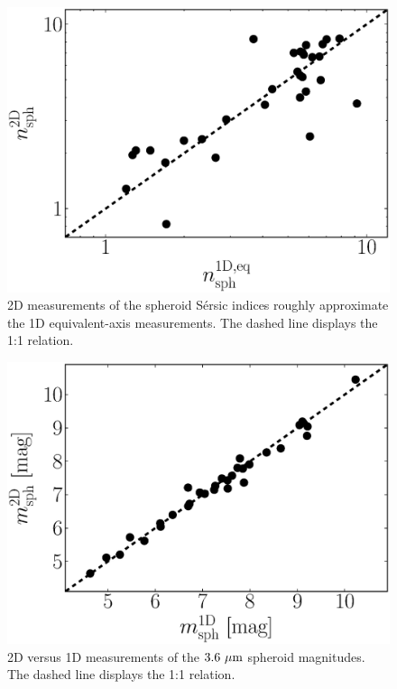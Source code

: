 \documentclass[preprint2]{emulateapj}
\begin{document}
\begin{figure}[h]
\begin{center}
\includegraphics[width=\columnwidth]{comparison_n.eps} 
\caption{2D measurements of the spheroid S\'ersic indices roughly approximate the 1D equivalent-axis measurements. 
The dashed line displays the 1:1 relation.}
\label{fig:n1d2d}
\end{center}
\end{figure}

\begin{figure}[h]
\begin{center}
\includegraphics[width=\columnwidth]{comparison_mag.eps} 
\caption{2D versus 1D measurements of the $3.6~\rm \mu m$ spheroid magnitudes. The dashed line displays the 1:1 relation.}
\label{fig:mag1d2d}
\end{center}
\end{figure}
\end{document}
